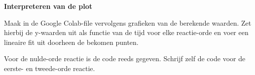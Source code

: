\documentclass{ximera}
\begin{document}
\begin{question}\textbf{Interpreteren van de plot}

Maak in de Google Colab-file vervolgens grafieken van de berekende waarden. Zet hierbij de y-waarden uit als functie van de tijd voor elke reactie-orde en voer een lineaire fit uit doorheen de bekomen punten.

Voor de nulde-orde reactie is de code reeds gegeven. Schrijf zelf de code voor de eerste- en tweede-orde reactie.

\end{question}
\end{document}
